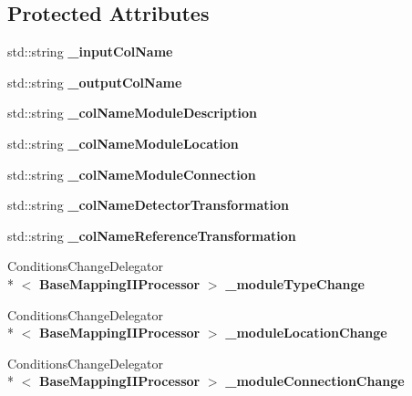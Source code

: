 \subsection*{Protected Attributes}
\begin{DoxyCompactItemize}
\item 
std\-::string {\bfseries \-\_\-input\-Col\-Name}\label{classCALICE_1_1BaseMappingIIProcessor_a89f87c70722b470ce3351a1a94a04c5d}

\item 
std\-::string {\bfseries \-\_\-output\-Col\-Name}\label{classCALICE_1_1BaseMappingIIProcessor_a55c4612d6057c09ccabb5bce43cfd184}

\item 
std\-::string {\bfseries \-\_\-col\-Name\-Module\-Description}\label{classCALICE_1_1BaseMappingIIProcessor_a3cf654ae79db0b075343f05f66b86974}

\item 
std\-::string {\bfseries \-\_\-col\-Name\-Module\-Location}\label{classCALICE_1_1BaseMappingIIProcessor_a2ca5ef0fe54cf330a00b5a89fe7baacf}

\item 
std\-::string {\bfseries \-\_\-col\-Name\-Module\-Connection}\label{classCALICE_1_1BaseMappingIIProcessor_a0a03a8f94ec07d56db8cb88174fe72cd}

\item 
std\-::string {\bfseries \-\_\-col\-Name\-Detector\-Transformation}\label{classCALICE_1_1BaseMappingIIProcessor_aed612620eab1d8ebeb5a584826f70781}

\item 
std\-::string {\bfseries \-\_\-col\-Name\-Reference\-Transformation}\label{classCALICE_1_1BaseMappingIIProcessor_a944b28e0d8de4b183e9dced0d24aa863}

\item 
Conditions\-Change\-Delegator\\*
$<$ {\bf Base\-Mapping\-I\-I\-Processor} $>$ {\bfseries \-\_\-module\-Type\-Change}\label{classCALICE_1_1BaseMappingIIProcessor_aec48652f1896782024ba9cf85eaeb0f9}

\item 
Conditions\-Change\-Delegator\\*
$<$ {\bf Base\-Mapping\-I\-I\-Processor} $>$ {\bfseries \-\_\-module\-Location\-Change}\label{classCALICE_1_1BaseMappingIIProcessor_abbc58227157b9c1c293845f46e41b37a}

\item 
Conditions\-Change\-Delegator\\*
$<$ {\bf Base\-Mapping\-I\-I\-Processor} $>$ {\bfseries \-\_\-module\-Connection\-Change}\label{classCALICE_1_1BaseMappingIIProcessor_a862d6f636084c8a5b97a3d325aaf9115}


\end{DoxyCompactItemize}
